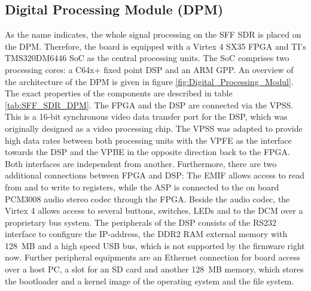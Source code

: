 \subsection{Digital Processing Module (DPM)}
As the name indicates, the whole signal processing on the SFF SDR is placed on the \ac{DPM}. Therefore, the board is equipped with a Virtex 4 SX35 FPGA \cite{virtex4} and TI's TMS320DM6446 \ac{SoC} \cite{ti_dm6446} as the central processing units. The \ac{SoC} comprises two processing cores: a C64x+ fixed point \ac{DSP} and an ARM \ac{GPP}. An overview of the architecture of the \ac{DPM} is given in figure \ref{fig:Digital_Processing_Modul}. The exact properties of the components are described in table \ref{tab:SFF_SDR_DPM}. The \ac{FPGA} and the \ac{DSP} are connected via the \ac{VPSS}. This is a 16-bit synchronous video data transfer port for the \ac{DSP}, which was originally designed as a video processing chip. The \ac{VPSS} was adapted to provide high data rates between both processing units with the \ac{VPFE} as the interface towards the DSP and the \ac{VPBE} in the opposite direction back to the FPGA. Both interfaces are independent from another. Furthermore, there are two additional connections between \ac{FPGA} and \ac{DSP}: The \ac{EMIF} allows access to read from and to write to registers, while the \ac{ASP} is connected to the on board PCM3008 audio stereo codec through the \ac{FPGA}. Beside the audio codec, the Virtex 4 allows access to several buttons, switches, LEDs and to the \ac{DCM} over a proprietary bus system. The peripherals of the DSP consists of the RS232 interface to configure the IP-address, the DDR2 RAM external memory with \SI{128}{MB} and a high speed USB bus, which is not supported by the firmware right now. Further peripheral equipments are an Ethernet connection for board access over a host PC, a slot for an SD card and another \SI{128}{MB} memory, which stores the bootloader and a kernel image of the operating system and the file system.


